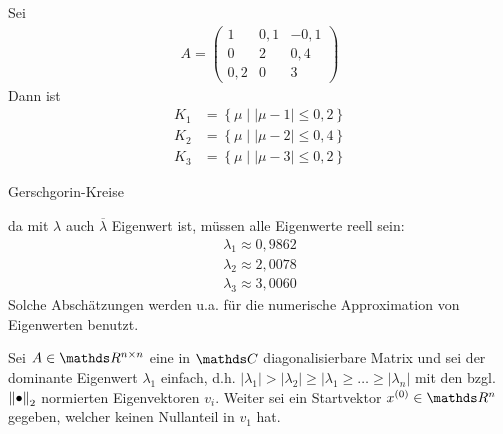   \begin{Bspe}
    Sei 
    \begin{gather*}
      A=
      \begin{pmatrix}
        1 & 0,1 & -0,1\\
        0 & 2 & 0,4 \\
        0,2 & 0 & 3
      \end{pmatrix}
    \end{gather*}
    Dann ist
    \begin{align*}
      K_1 &= \left\{ \mu \mid |\mu-1|\leq 0,2 \right\} \\
      K_2 &= \left\{ \mu \mid |\mu-2|\leq 0,4 \right\} \\
      K_3 &= \left\{ \mu \mid |\mu-3|\leq 0,2 \right\}
    \end{align*}
    \begin{image}{Gerschgorin-Kreise}
\end{image}
da mit $\lambda$ auch $\overline{\lambda}$ Eigenwert ist,
müssen alle Eigenwerte reell sein:
\begin{align*}
  \lambda_1 \approx 0,9862 \\
  \lambda_2 \approx 2,0078 \\
  \lambda_3 \approx 3,0060
\end{align*}
Solche Abschätzungen werden u.a. für die numerische
Approximation von Eigenwerten benutzt.
\end{Bspe}


\label{8.2.1}
Sei $A\in\R^{n\times n}$ eine  in $\C$
diagonalisierbare Matrix und 
sei der dominante Eigenwert $\lambda_1$ einfach,
d.h. 
$|\lambda_1|>|\lambda_2|\geq |\lambda_1\geq \ldots\geq |\lambda_n|$
mit den bzgl. $\left\| \bullet \right\|_2$ normierten Eigenvektoren $v_i$.
Weiter sei ein Startvektor $x^{(0)}\in\R^n$ gegeben,
welcher 
keinen Nullanteil in $v_1$ hat.

